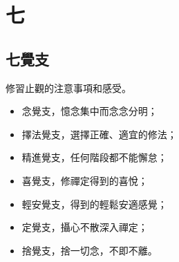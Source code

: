 \section{七}

\subsection{七覺支}
修習止觀的注意事項和感受。
\begin{itemize}
  \item 念覺支，憶念集中而念念分明；
  \item 擇法覺支，選擇正確、適宜的修法；
  \item 精進覺支，任何階段都不能懈怠；
  \item 喜覺支，修禪定得到的喜悅；
  \item 輕安覺支，得到的輕鬆安適感覺；
  \item 定覺支，攝心不散深入禪定；
  \item 捨覺支，捨一切念，不即不離。
\end{itemize}
